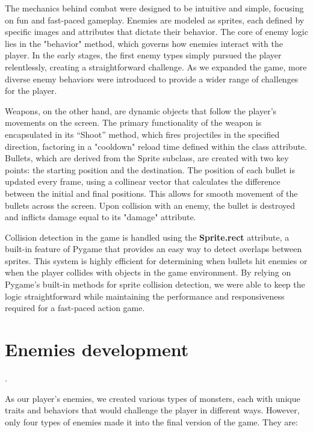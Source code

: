 \documentclass[a4paper,12pt]{article}
\begin{document}
The mechanics behind combat were designed to be intuitive and simple, focusing on fun and fast-paced gameplay. Enemies are modeled as sprites, each defined by specific images and attributes that dictate their behavior. The core of enemy logic lies in the "behavior" method, which governs how enemies interact with the player. In the early stages, the first enemy types simply pursued the player relentlessly, creating a straightforward challenge. As we expanded the game, more diverse enemy behaviors were introduced to provide a wider range of challenges for the player.

Weapons, on the other hand, are dynamic objects that follow the player’s movements on the screen. The primary functionality of the weapon is encapsulated in its “Shoot” method, which fires projectiles in the specified direction, factoring in a "cooldown" reload time defined within the class attribute. Bullets, which are derived from the Sprite subclass, are created with two key points: the starting position and the destination. The position of each bullet is updated every frame, using a collinear vector that calculates the difference between the initial and final positions. This allows for smooth movement of the bullets across the screen. Upon collision with an enemy, the bullet is destroyed and inflicts damage equal to its "damage" attribute.

Collision detection in the game is handled using the \textbf{Sprite.rect} attribute, a built-in feature of Pygame that provides an easy way to detect overlaps between sprites. This system is highly efficient for determining when bullets hit enemies or when the player collides with objects in the game environment. By relying on Pygame’s built-in methods for sprite collision detection, we were able to keep the logic straightforward while maintaining the performance and responsiveness required for a fast-paced action game.

\section*{Enemies development}
.

As our player's enemies, we created various types of monsters, each with unique traits and behaviors that would challenge the player in different ways. However, only four types of enemies made it into the final version of the game. They are:
\end{document}
